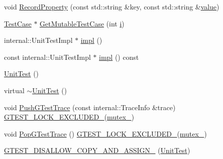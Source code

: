 \begin{DoxyCompactItemize}
\item 
void \mbox{\hyperlink{classtesting_1_1_unit_test_a2c96a4a02c34095e07c6999e7686367f}{Record\+Property}} (const std\+::string \&key, const std\+::string \&\mbox{\hyperlink{_obj__test_2lib_2googletest-master_2googlemock_2test_2gmock-matchers__test_8cc_a337b8a670efc0b086ad3af163f3121b6}{value}})
\item 
\mbox{\hyperlink{classtesting_1_1_test_case}{Test\+Case}} $\ast$ \mbox{\hyperlink{classtesting_1_1_unit_test_ad741830280b12c07874b2d37a6ee5c02}{Get\+Mutable\+Test\+Case}} (int \mbox{\hyperlink{_obj__test_2lib_2googletest-master_2googlemock_2test_2gmock-matchers__test_8cc_acb559820d9ca11295b4500f179ef6392}{i}})
\item 
internal\+::\+Unit\+Test\+Impl $\ast$ \mbox{\hyperlink{classtesting_1_1_unit_test_a4df5d11a58affb337d7fa62eaa07690e}{impl}} ()
\item 
const internal\+::\+Unit\+Test\+Impl $\ast$ \mbox{\hyperlink{classtesting_1_1_unit_test_a266a9f49070d1959c1c9d649423879b4}{impl}} () const
\item 
\mbox{\hyperlink{classtesting_1_1_unit_test_a5e646d37f980429c310af696c8775f5c}{Unit\+Test}} ()
\item 
virtual \mbox{\hyperlink{classtesting_1_1_unit_test_a6bbd0cfbacdf8e438f4e422916683c57}{$\sim$\+Unit\+Test}} ()
\item 
void \mbox{\hyperlink{classtesting_1_1_unit_test_af455b953108ff09b3b6e41011653e78a}{Push\+G\+Test\+Trace}} (const internal\+::\+Trace\+Info \&trace) \mbox{\hyperlink{_obj__test_2lib_2googletest-release-1_88_81_2googletest_2include_2gtest_2internal_2gtest-port_8h_a69abff5a4efdd07bd5faebe3dd318d06}{G\+T\+E\+S\+T\+\_\+\+L\+O\+C\+K\+\_\+\+E\+X\+C\+L\+U\+D\+E\+D\+\_\+}}(\mbox{\hyperlink{classtesting_1_1_unit_test_abb94ef45cf0ab43be81ac6d5b1364132}{mutex\+\_\+}})
\item 
void \mbox{\hyperlink{classtesting_1_1_unit_test_a70b3e3282778bc9a36520fe0a8be3c57}{Pop\+G\+Test\+Trace}} () \mbox{\hyperlink{_obj__test_2lib_2googletest-release-1_88_81_2googletest_2include_2gtest_2internal_2gtest-port_8h_a69abff5a4efdd07bd5faebe3dd318d06}{G\+T\+E\+S\+T\+\_\+\+L\+O\+C\+K\+\_\+\+E\+X\+C\+L\+U\+D\+E\+D\+\_\+}}(\mbox{\hyperlink{classtesting_1_1_unit_test_abb94ef45cf0ab43be81ac6d5b1364132}{mutex\+\_\+}})
\item 
\mbox{\hyperlink{classtesting_1_1_unit_test_a1e04cfb4f837cea288a98f2a64c43bba}{G\+T\+E\+S\+T\+\_\+\+D\+I\+S\+A\+L\+L\+O\+W\+\_\+\+C\+O\+P\+Y\+\_\+\+A\+N\+D\+\_\+\+A\+S\+S\+I\+G\+N\+\_\+}} (\mbox{\hyperlink{classtesting_1_1_unit_test}{Unit\+Test}})
\end{DoxyCompactItemize}
